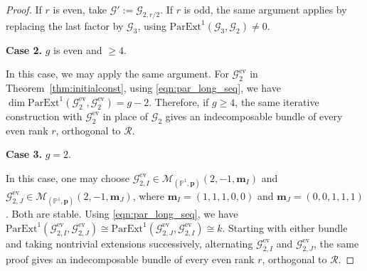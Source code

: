 \documentclass[10pt,a4paper]{amsart}
\newcommand{\PP}{\mathbb{P} }
\newcommand{\bm}{\mathbf{m} }
\newcommand{\bp}{\mathbf{p} }
\newcommand{\cG}{\mathcal{G} }
\newcommand{\cM}{\mathcal{M} }
\newcommand{\cR}{\mathcal{R} }
\def\pExt{\mathrm{ParExt} }
\begin{document}
\begin{proof}
If \(r\) is even, take \(\cG':=\cG_{2,r/2}\). If \(r\) is odd, the same argument applies by replacing the last factor by \(\cG_3\), using \(\pExt^1(\cG_3,\cG_2)\ne0\).

\textbf{Case 2.} \(g\) is even and \(\ge 4\).

In this case, we may apply the same argument. For \(\cG_2^{\mathrm{ev}}\) in Theorem~\ref{thm:initialconst}, using \eqref{eqn:par_long_seq}, we have \(\dim \pExt^1(\cG_2^{\mathrm{ev}}, \cG_2^{\mathrm{ev}}) = g-2\). Therefore, if \(g \ge 4\), the same iterative construction with \(\cG_2^{\mathrm{ev}}\) in place of \(\cG_2\) gives an indecomposable bundle of every even rank \(r\), orthogonal to \(\cR\).

\textbf{Case 3.} \(g = 2\).

In this case, one may choose \(\cG_{2, I}^{\mathrm{ev}} \in \cM_{(\PP^1, \bp)}(2, -1, \bm_I)\) and \(\cG_{2, J}^{\mathrm{ev}} \in \cM_{(\PP^1, \bp)}(2, -1, \bm_J)\), where \(\bm_I = (1, 1, 1, 0, 0)\) and \(\bm_J = (0, 0, 1, 1, 1)\). Both are stable. Using \eqref{eqn:par_long_seq}, we have \(\pExt^1(\cG_{2, I}^{\mathrm{ev}}, \cG_{2, J}^{\mathrm{ev}})\cong\pExt^1(\cG_{2, J}^{\mathrm{ev}}, \cG_{2, I}^{\mathrm{ev}})\cong k\). Starting with either bundle and taking nontrivial extensions successively, alternating \(\cG_{2,I}^{\mathrm{ev}}\) and \(\cG_{2,J}^{\mathrm{ev}}\), the same proof gives an indecomposable bundle of every even rank \(r\), orthogonal to \(\cR\).
\end{proof}
\end{document}

